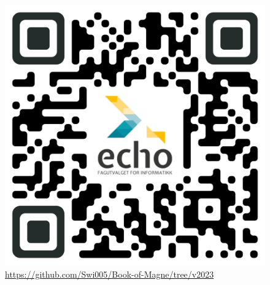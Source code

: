     \begin{figure}[!h]
        \centering
        \includegraphics[scale=0.3]{assets/qrcode.png}
        \caption{\url{https://github.com/Swi005/Book-of-Magne/tree/v2023}}
        \label{fig:qr}
    \end{figure}

    \newpage